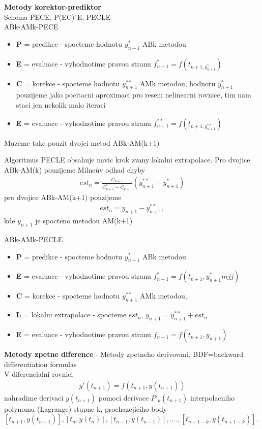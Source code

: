 \documentclass[a4]{report}
\theoremstyle{definition}
\begin{document}
{\textbf{Metody korektor-prediktor} \\
Schema PECE, P(EC)$^{s}$E, PECLE \\
ABk-AMk-PECE
\begin{itemize}
\item \textbf{P} = predikce - spocteme hodnotu $y^{*}_{n+1}$ ABk metodou 
\item \textbf{E} = evaluace - vyhodnotime pravou stranu $f^{*}_{n+1}=f(t_{n+1,y^{*}_{n+1}})$
\item \textbf{C} = korekce - spocteme hodnotu $y^{**}_{n+1}$ AMk metodou, hodnotu $y^{*}_{n+1}$ pouzijeme jako pocitacni aproximaci pro reseni nelinearni rovnice, tim nam staci jen nekolik malo iteraci
\item \textbf{E} = evaluace - vyhodnotime pravou stranu $f^{**}_{n+1}=f(t_{n+1,y^{**}_{n+1}})$
\end{itemize}

Muzeme take pouzit dvojci metod ABk-AM(k+1)

Algoritmus PECLE obsahuje navic krok zvany lokalni extrapolace. Pro dvojice ABk-AM(k) pouzijeme Milneův odhad  chyby 
\begin{align}
est_{n}=\frac{C_{k+1}}{C^{*}_{k+1}-C_{k+1}}(y^{**}_{n+1}-y^{*}_{n+1})
\end{align}
pro dvojice ABk-AM(k+1) pouzijeme
\begin{align}
est_{n}=y_{n+1}-y^{**}_{n+1},
\end{align}
kde $y_{n+1}$ je spocteno metodou AM(k+1)

ABk-AMk-PECLE
\begin{itemize}
\item \textbf{P} = predikce - spocteme hodnotu $y^{*}_{n+1}$ ABk metodou 
\item \textbf{E} = evaluace - vyhodnotime pravou stranu $f^{*}_{n+1}=f(t_{n+1},y^{*}_{n+1}mjj)$
\item \textbf{C} = korekce - spocteme hodnotu $y^{**}_{n+1}$ AMk metodou, 
\item \textbf{L} = lokalni extrapolace - spocteme $est_{n}$,  $y_{n+1}=y^{**}_{n+1}+est_{n}$
\item \textbf{E} = evaluace - vyhodnotime pravou stranu $f_{n+1}=f(t_{n+1},y_{n+1})$
\end{itemize}

\textbf{Metody zpetne diference}
- Metody zpetneho derivovani, BDF=backward differentiation formulas \\

V diferencialni rovnici
\begin{align}
y'(t_{n+1})=f(t_{n+1},y(t_{n+1}))
\end{align}
nahradime derivaci $y(t_{n+1})$ pomoci derivace $P'_{k}(t_{n+1})$ interpolacniho polynomu (Lagrange) stupne k, prochazejiciho body $[t_{n+1},y(t_{n+1})],[t_{n},y(t_{n})], [t_{n-1},y(t_{n-1})],...., [t_{n+1-k},y(t_{n+1-k})]$. 

}
\end{document}
